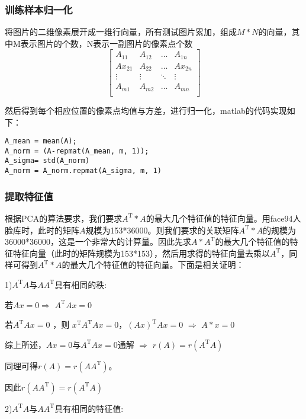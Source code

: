 \documentclass[a4paper,12pt]{ctexart}
\begin{document}
\subsubsection{训练样本归一化}

将图片的二维像素展开成一维行向量，所有测试图片累加，组成$M*N$的向量，其中M表示图片的个数，N表示一副图片的像素点个数
\[
\begin{bmatrix}
A_{11} & A_{12} & \ldots & A_{1n}\\
Ax_{21} & A_{22} & \ldots & Ax_{2n}\\
\vdots & \vdots & \ddots & \vdots\\
A_{m1} & A_{m2} & \ldots & A_{mn}\\
\end{bmatrix}
\]

然后得到每个相应位置的像素点均值与方差，进行归一化，matlab的代码实现如下：

\begin{lstlisting}
A_mean = mean(A);
A_norm = (A-repmat(A_mean, m, 1));
A_sigma= std(A_norm)
A_norm = A_norm.repmat(A_sigma, m, 1)
\end{lstlisting}

\subsubsection{提取特征值}

根据PCA的算法要求，我们要求$A^\mathrm{T}*A$的最大几个特征值的特征向量。用face94人脸库时，此时的矩阵$A$规模为153*36000。则我们要求的关联矩阵$A^\mathrm{T}*A$的规模为36000*36000，这是一个非常大的计算量。因此先求$A*A^\mathrm{T}$的最大几个特征值的特征特征向量（此时的矩阵规模为153*153），然后用求得的特征向量去乘以$A^\mathrm{T}$，同样可得到$A^\mathrm{T}*A$的最大几个特征值的特征向量。下面是相关证明：

1)$A^\mathrm{T}A$与$AA^\mathrm{T}$具有相同的秩:

若$Ax=0$\quad $\Longrightarrow$ \quad$A^\mathrm{T}Ax=0 $

若$A^\mathrm{T}Ax=0 $ ，则 $x^\mathrm{T}A^\mathrm{T}Ax=0 $，$(Ax)^\mathrm{T}Ax=0$ \quad $\Longrightarrow$ \quad $A*x=0$

综上所述，$Ax=0$与$A^\mathrm{T}Ax=0$通解 \quad $\Longrightarrow$ \quad $r(A)=r(A^\mathrm{T}A)$

同理可得$r(A)=r(AA^\mathrm{T})$。

因此$r(AA^\mathrm{T})=r(A^\mathrm{T}A)$
\newline

2)$A^\mathrm{T}A$与$AA^\mathrm{T}$具有相同的特征值:
\end{document}

